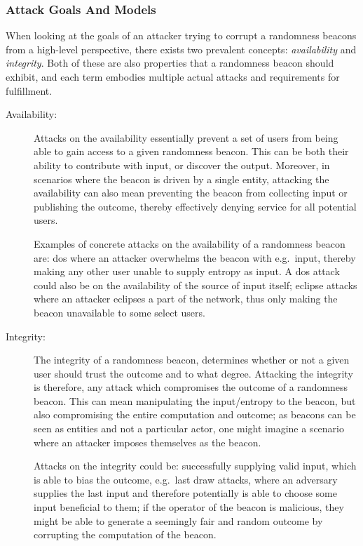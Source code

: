 \subsubsection{Attack Goals And Models}\label{ssub:attack_goals_and_models}
When looking at the goals of an attacker trying to corrupt a randomness beacons from a high-level perspective, there exists two prevalent concepts: \emph{availability} and \emph{integrity}.
Both of these are also properties that a randomness beacon should exhibit, and each term embodies multiple actual attacks and requirements for fulfillment.

\begin{description}
    \item[Availability:]
        Attacks on the availability essentially prevent a set of users from being able to gain access to a given randomness beacon.
        This can be both their ability to contribute with input, or discover the output.
        Moreover, in scenarios where the beacon is driven by a single entity, attacking the availability can also mean preventing the beacon from collecting input or publishing the outcome, thereby effectively denying service for all potential users.

        Examples of concrete attacks on the availability of a randomness beacon are:
        \acrfull{dos} where an attacker overwhelms the beacon with e.g.\ input, thereby making any other user unable to supply entropy as input. A \gls{dos} attack could also be on the availability of the source of input itself; eclipse attacks where an attacker eclipses a part of the network, thus only making the beacon unavailable to some select users.
    \item[Integrity:]
        The integrity of a randomness beacon, determines whether or not a given user should trust the outcome and to what degree.
        Attacking the integrity is therefore, any attack which compromises the outcome of a randomness beacon.
        This can mean manipulating the input/entropy to the beacon, but also compromising the entire computation and outcome;
        as beacons can be seen as entities and not a particular actor, one might imagine a scenario where an attacker imposes themselves as the beacon.

        Attacks on the integrity could be: successfully supplying valid input, which is able to bias the outcome, e.g.\ last draw attacks, where an adversary supplies the last input and therefore potentially is able to choose some input beneficial to them; if the operator of the beacon is malicious, they might be able to generate a seemingly fair and random outcome by corrupting the computation of the beacon.
\end{description}


